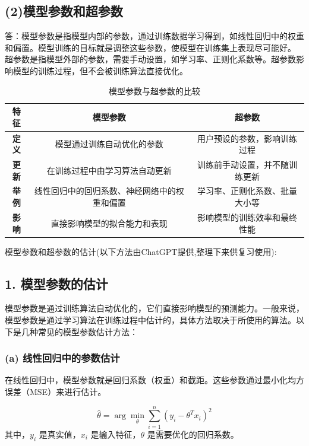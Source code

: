 \documentclass{article}
\begin{document}
\subsection{(2)模型参数和超参数}
答：模型参数是指模型内部的参数，通过训练数据学习得到，如线性回归中的权重和偏置。模型训练的目标就是调整这些参数，使模型在训练集上表现尽可能好。\\
超参数是指模型外部的参数，需要手动设置，如学习率、正则化系数等。超参数影响模型的训练过程，但不会被训练算法直接优化。\\
\begin{table}[ht]
    \centering
    \begin{tabular}{|c|c|c|}
    \hline
    \textbf{特征} & \textbf{模型参数} & \textbf{超参数} \\
    \hline
    \textbf{定义} & 模型通过训练自动优化的参数 & 用户预设的参数，影响训练过程 \\
    \hline
    \textbf{更新} & 在训练过程中由学习算法自动更新 & 训练前手动设置，并不随训练更新 \\
    \hline
    \textbf{举例} & 线性回归中的回归系数、神经网络中的权重和偏置 & 学习率、正则化系数、批量大小等 \\
    \hline
    \textbf{影响} & 直接影响模型的拟合能力和表现 & 影响模型的训练效率和最终性能 \\
    \hline
    \end{tabular}
    \caption{模型参数与超参数的比较}
\end{table}
    
模型参数和超参数的估计(以下方法由ChatGPT提供,整理下来供复习使用):\\

\subsection*{1. 模型参数的估计}

模型参数是通过训练算法自动优化的，它们直接影响模型的预测能力。一般来说，模型参数是通过学习算法在训练过程中估计的，具体方法取决于所使用的算法。以下是几种常见的模型参数估计方法：

\subsubsection*{(a) 线性回归中的参数估计}
在线性回归中，模型参数就是回归系数（权重）和截距。这些参数通过最小化均方误差（MSE）来进行估计。

\[\hat{\theta} = \arg\min_\theta \sum_{i=1}^n \left( y_i - \theta^T x_i \right)^2\]
其中，$y_i$ 是真实值，$x_i$ 是输入特征，$\theta$ 是需要优化的回归系数。
\end{document}
